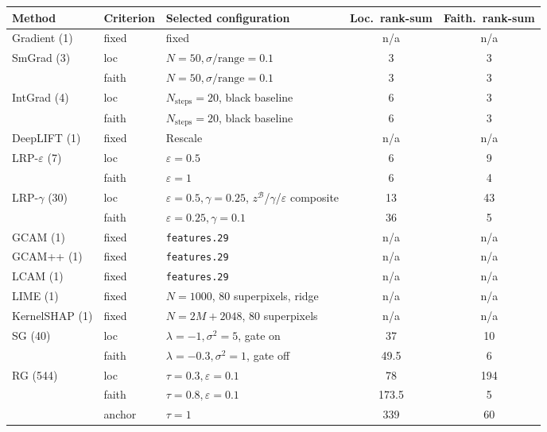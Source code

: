 \begin{tabular}{@{}l l l c c@{}}
\toprule
Method & Criterion & Selected configuration & Loc.\ rank-sum & Faith.\ rank-sum \\
\midrule
Gradient (1) & fixed & fixed & n/a & n/a \\
\addlinespace
SmGrad (3) & loc & $N{=}50,\sigma/\mathrm{range}{=}0.1$ & 3 & 3 \\
 & faith & $N{=}50,\sigma/\mathrm{range}{=}0.1$ & 3 & 3 \\
\addlinespace
IntGrad (4) & loc & $N_{\mathrm{steps}}{=}20$, black baseline & 6 & 3 \\
 & faith & $N_{\mathrm{steps}}{=}20$, black baseline & 6 & 3 \\
\addlinespace
DeepLIFT (1) & fixed & Rescale & n/a & n/a \\
\addlinespace
LRP-$\varepsilon$ (7) & loc & $\varepsilon{=}0.5$ & 6 & 9 \\
 & faith & $\varepsilon{=}1$ & 6 & 4 \\
\addlinespace
LRP-$\gamma$ (30) & loc & $\varepsilon{=}0.5,\gamma{=}0.25$, $z^{\mathcal{B}}$/$\gamma$/$\varepsilon$ composite & 13 & 43 \\
 & faith & $\varepsilon{=}0.25,\gamma{=}0.1$ & 36 & 5 \\
\addlinespace
GCAM (1) & fixed & \texttt{features.29} & n/a & n/a \\
\addlinespace
GCAM++ (1) & fixed & \texttt{features.29} & n/a & n/a \\
\addlinespace
LCAM (1) & fixed & \texttt{features.29} & n/a & n/a \\
\addlinespace
LIME (1) & fixed & $N{=}1000$, 80 superpixels, ridge & n/a & n/a \\
\addlinespace
KernelSHAP (1) & fixed & $N{=}2M{+}2048$, 80 superpixels & n/a & n/a \\
\addlinespace
SG (40) & loc & $\lambda{=}{-}1,\sigma^2{=}5$, gate on & 37 & 10 \\
 & faith & $\lambda{=}{-}0.3,\sigma^2{=}1$, gate off & 49.5 & 6 \\
\addlinespace
RG (544) & loc & $\tau{=}0.3,\varepsilon{=}0.1$ & 78 & 194 \\
 & faith & $\tau{=}0.8,\varepsilon{=}0.1$ & 173.5 & 5 \\
 & anchor & $\tau{=}1$ & 339 & 60 \\
\bottomrule
\end{tabular}
